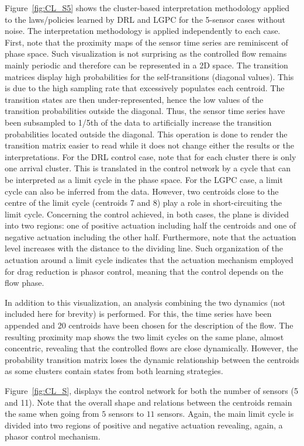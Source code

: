 Figure~\ref{fig:CL_S5} shows the cluster-based interpretation methodology applied to the laws/policies learned by DRL and LGPC for the 5-sensor cases without noise. The interpretation methodology is applied independently to each case. First, note that the proximity maps of the sensor time series are reminiscent of phase space. Such visualization is not surprising as the controlled flow remains mainly periodic and therefore can be represented in a 2D space. The transition matrices display high probabilities for the self-transitions (diagonal values). This is due to the high sampling rate that excessively populates each centroid. The transition states are then under-represented, hence the low values of the transition probabilities outside the diagonal. Thus, the sensor time series have been subsampled to 1/5th of the data to artificially increase the transition probabilities located outside the diagonal. This operation is done to render the transition matrix easier to read while it does not change either the results or the interpretations. For the DRL control case, note that for each cluster there is only one arrival cluster. This is translated in the control network by a cycle that can be interpreted as a limit cycle in the phase space. For the LGPC case, a limit cycle can also be inferred from the data. However, two centroids close to the centre of the limit cycle (centroids 7 and 8) play a role in short-circuiting the limit cycle. Concerning the control achieved, in both cases, the plane is divided into two regions: one of positive actuation including half the centroids and one of negative actuation including the other half. Furthermore, note that the actuation level increases with the distance to the dividing line. Such organization of the actuation around a limit cycle indicates that the actuation mechanism employed for drag reduction is phasor control, meaning that the control depends on the flow phase.

In addition to this visualization, an analysis combining the two dynamics (not included here for brevity) is performed. For this, the time series have been appended and 20 centroids have been chosen for the description of the flow. The resulting proximity map shows the two limit cycles on the same plane, almost concentric, revealing that the controlled flows are close dynamically. However, the probability transition matrix loses the dynamic relationship between the centroids as some clusters contain states from both learning strategies. 

Figure~\ref{fig:CL_S}, displays the control network for both the number of sensors (5 and 11). Note that the overall shape and relations between the centroids remain the same when going from $5$ sensors to $11$ sensors. Again, the main limit cycle is divided into two regions of positive and negative actuation revealing, again, a phasor control mechanism.

